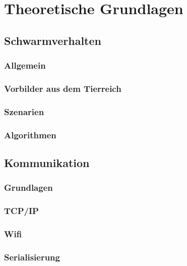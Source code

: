\newpage
\section{Theoretische Grundlagen}

\subsection{Schwarmverhalten}
\subsubsection{Allgemein}
\subsubsection{Vorbilder aus dem Tierreich}
\subsubsection{Szenarien}
\subsubsection{Algorithmen}

\subsection{Kommunikation} %

\subsubsection{Grundlagen}
\subsubsection{TCP/IP}
\subsubsection{Wifi}
\subsubsection{Serialisierung} %